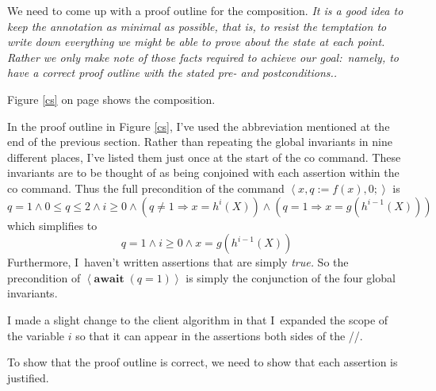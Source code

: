 \documentclass[muchmore,11pt]{article}%
\begin{document}
We need to come up with a proof outline for the composition. \emph{It is a
good idea to keep the annotation as minimal as possible, that is, to resist
the temptation to write down everything we might be able to prove about the
state at each point. Rather we only make note of those facts required to
achieve our goal:\ namely, to have a correct proof outline with the stated
pre- and postconditions..}

Figure \ref{cs} on page \pageref{cs} shows the composition.

In the proof outline in Figure \ref{cs}, I've used the abbreviation mentioned
at the end of the previous section. Rather than repeating the global
invariants in nine different places, I've listed them just once at the start
of the co command. These invariants are to be thought of as being conjoined
with each assertion within the co command. Thus the full precondition of the
command $\left\langle x,q:=f(x),0;\right\rangle $ is%
\[
q=1\wedge0\leq q\leq2\wedge i\geq0\wedge\left(  q\neq1\Rightarrow
x=h^{i}(X)\right)  \wedge\left(  q=1\Rightarrow x=g(h^{i-1}(X))\right)
\]
which simplifies to%
\[
q=1\wedge i\geq0\wedge x=g(h^{i-1}(X))
\]
Furthermore, I\ haven't written assertions that are simply \textit{true.} So
the precondition of $\left\langle \mathbf{await\;}(q=1)\right\rangle $ is
simply the conjunction of the four global invariants.

I made a slight change to the client algorithm in that I\ expanded the scope
of the variable $i$ so that it can appear in the assertions both sides of the //.

To show that the proof outline is correct, we need to show that each assertion
is justified.
\end{document}
